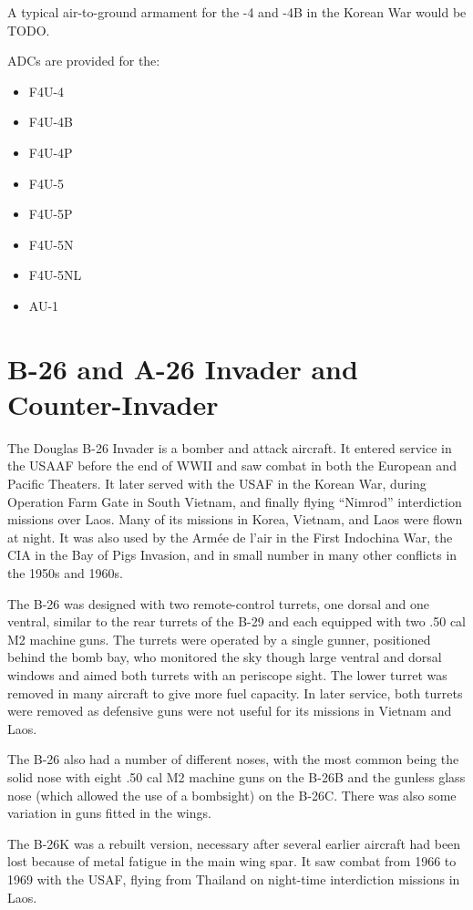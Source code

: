 A typical air-to-ground armament for the -4 and -4B in the Korean War would be TODO. 

ADCs are provided for the:
\begin{itemize}
\item F4U-4
\item F4U-4B
\item F4U-4P
\item F4U-5
\item F4U-5P
\item F4U-5N
\item F4U-5NL
\item AU-1
\end{itemize}

\section*{B-26 and A-26 Invader and Counter-Invader}

The Douglas B-26 Invader is a bomber and attack aircraft. It entered service in the USAAF before the end of WWII and saw combat in both the European and  Pacific Theaters. It later served with the USAF in the Korean War, during Operation Farm Gate in South Vietnam, and finally flying “Nimrod” interdiction missions over Laos. Many of its missions in Korea, Vietnam, and Laos were flown at night. It was also used by the Armée de l'air in the First Indochina War, the CIA in the Bay of Pigs Invasion, and in small number in many other conflicts in the 1950s and 1960s.

The B-26 was designed with two remote-control turrets, one dorsal and one ventral, similar to the rear turrets of the B-29 and each equipped with two .50 cal M2 machine guns. The turrets were operated by a single gunner, positioned behind the bomb bay, who monitored the sky though large ventral and dorsal windows and aimed both turrets with an periscope sight. The lower turret was removed in many aircraft to give more fuel capacity. In later service, both turrets were removed as defensive guns were not useful for its missions in Vietnam and Laos. 

The B-26 also had a number of different noses, with the most common being the solid nose with eight .50 cal M2 machine guns on the B-26B and the gunless glass nose (which allowed the use of a bombsight) on the B-26C. There was also some variation in guns fitted in the wings.

The B-26K was a rebuilt version, necessary after several earlier aircraft had been lost because of metal fatigue in the main wing spar. It saw combat from 1966 to 1969 with the USAF, flying from Thailand on night-time interdiction missions in Laos. 

